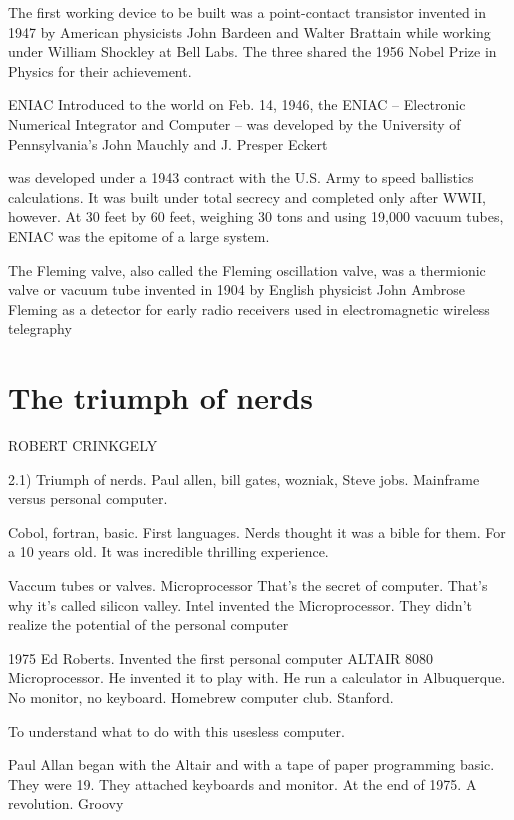   
  The first working device to be built was a point-contact transistor invented in 1947 by American physicists John Bardeen and Walter 
  Brattain 
  while working under William Shockley at Bell Labs. The three shared the 1956 Nobel Prize in Physics for their achievement.
  
  ENIAC Introduced to the world on Feb. 14, 1946, the ENIAC -- Electronic Numerical Integrator and Computer -- was developed by the 
  University 
  of Pennsylvania's John Mauchly and J. Presper Eckert 
  
  was developed under a 1943 contract with the U.S. Army to speed ballistics calculations. It was built under total secrecy and completed 
  only 
  after WWII, however. At 30 feet by 60 feet, weighing 30 tons and using 19,000 vacuum tubes, ENIAC was the epitome of a large system.
  
  The Fleming valve, also called the Fleming oscillation valve, was a thermionic valve or vacuum tube invented in 1904 by English physicist 
  John Ambrose Fleming as a detector for early radio receivers used in electromagnetic wireless telegraphy
  
 
  \section{The triumph of nerds}
  ROBERT CRINKGELY
  
  2.1) Triumph of nerds. Paul allen, bill gates, wozniak, Steve jobs. 
  Mainframe versus personal computer. 
  
  Cobol, fortran, basic. First languages. 
  Nerds thought it was a bible for them. For a 10 years old. It was incredible thrilling experience. 
  
  Vaccum tubes or valves. Microprocessor That's the secret of computer. That's why it's called silicon valley. Intel invented the 
  Microprocessor. 
  They didn't realize the potential of the personal computer
  
  
  
  
  1975 Ed Roberts. Invented the first personal computer ALTAIR 8080 Microprocessor. He invented it to play with. He run a calculator in 
  Albuquerque. No monitor, no keyboard. Homebrew computer club. Stanford. 
  
  To understand what to do with this usesless computer. 
  
  Paul Allan began with the Altair and with a tape of paper programming basic. They were 19. They attached keyboards and monitor. At the end 
  of 1975. A revolution. Groovy
  
